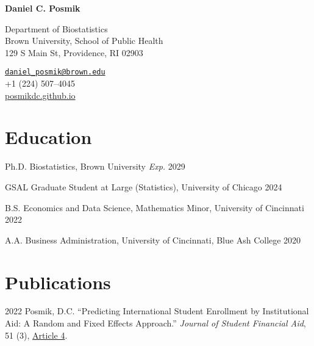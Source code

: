 \documentclass[11pt,letterpaper]{report}
\newcommand{\myname}{Daniel C. Posmik}
\newcommand{\namefont}[1]{{\normalfont\bfseries\Huge{#1}}}
\begin{document}
\raggedright{}

\namefont{\myname}

\vspace{1em}
\begin{minipage}[t]{0.700\textwidth}
Department of Biostatistics \\
Brown University, School of Public Health \\
129 S Main St, Providence, RI 02903 
\end{minipage}
\begin{minipage}[t]{0.295\textwidth}
\flushright{}
\href{mailto:daniel_posmik@brown.edu}{\tt daniel\_posmik@brown.edu} \\
+1 (224) 507--4045 \\
\href{https://posmikdc.github.io}{posmikdc.github.io}
\end{minipage}

\section*{Education}

\begin{tablist}
\item[Ph.D.] \tab{}Biostatistics, Brown University \hfill \emph{Exp.} 2029
\item[GSAL]  \tab{}Graduate Student at Large (Statistics), University of Chicago \hfill 2024
\item[B.S.]  \tab{}Economics and Data Science, Mathematics Minor, University of Cincinnati \hfill 2022
\item[A.A.] \tab{}Business Administration, University of Cincinnati, Blue Ash College \hfill 2020
\end{tablist}

\section*{Publications}

\begin{tablist}
\item[2022] \tab{}Posmik, D.C. \enquote{Predicting International Student Enrollment by Institutional Aid: A Random and Fixed Effects Approach.} \textit{Journal of Student Financial Aid}, 51 (3), \href{https://ir.library.louisville.edu/jsfa/vol51/iss3/4}{Article 4}. 
\end{tablist}
\end{document}
